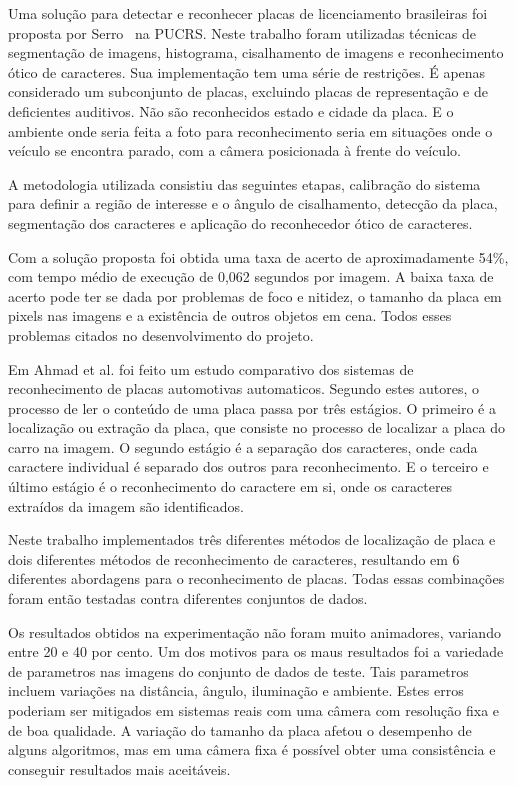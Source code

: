 
Uma solução para detectar e reconhecer placas de licenciamento brasileiras foi
proposta por Serro~\cite{serro2012deteccao} na PUCRS. Neste trabalho foram utilizadas
técnicas de segmentação de imagens, histograma, cisalhamento de imagens e reconhecimento
ótico de caracteres. Sua implementação tem uma série de restrições. É apenas considerado
um subconjunto de placas, excluindo placas de representação e de
deficientes auditivos. Não são reconhecidos estado e cidade da placa. E o
ambiente onde seria feita a foto para reconhecimento seria em situações onde o
veículo se encontra parado, com a câmera posicionada à frente do veículo.

A metodologia utilizada consistiu das seguintes etapas, calibração do sistema
para definir a região de interesse e o ângulo de cisalhamento, detecção da
placa, segmentação dos caracteres e aplicação do reconhecedor ótico de
caracteres.

Com a solução proposta foi obtida uma taxa de acerto de aproximadamente 54\%,
com tempo médio de execução de 0,062 segundos por imagem. A baixa taxa de acerto
pode ter se dada por problemas de foco e nitidez, o tamanho da placa em pixels
nas imagens e a existência de outros objetos em cena. Todos esses problemas
citados no desenvolvimento do projeto.

Em Ahmad et al.\cite{ahmad2015automatic} foi feito um estudo comparativo dos sistemas de
reconhecimento de placas automotivas automaticos. Segundo estes autores, o processo de
ler o conteúdo de uma placa passa por três estágios. O primeiro é a localização
ou extração da placa, que consiste no processo de localizar a placa do carro na
imagem. O segundo estágio é a separação dos caracteres, onde cada caractere
individual é separado dos outros para reconhecimento. E o terceiro e último
estágio é o reconhecimento do caractere em si, onde os caracteres extraídos da
imagem são identificados.

Neste trabalho implementados três diferentes métodos de localização de placa e dois
diferentes métodos de reconhecimento de caracteres, resultando em 6 diferentes
abordagens para o reconhecimento de placas. Todas essas combinações foram então
testadas contra diferentes conjuntos de dados.

Os resultados obtidos na experimentação não foram muito animadores, variando
entre 20 e 40 por cento. Um dos motivos para os maus resultados foi a variedade
de parametros nas imagens do conjunto de dados de teste. Tais parametros incluem
variações na distância, ângulo, iluminação e ambiente. Estes erros poderiam ser mitigados 
em sistemas reais com uma câmera com resolução fixa e de boa qualidade. A variação do
tamanho da placa afetou o desempenho de alguns algoritmos, mas em uma câmera
fixa é possível obter uma consistência e conseguir resultados mais aceitáveis.

